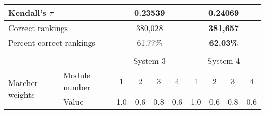 \documentclass[paper=a4, fontsize=11pt]{scrartcl}
\numberwithin{equation}{section}		%
\numberwithin{figure}{section}			%
\numberwithin{table}{section}				%
\begin{document}
\begin{table}[htbp]
{\begin{tabular}{llllllclll}
\multicolumn{2}{|l|}{Kendall's $\tau$}                                                           & \multicolumn{4}{c|}{0.23539}                                                                                      & \multicolumn{4}{c|}{{\bf 0.24069}}                                                                                \\ \hline
\multicolumn{2}{|l|}{Correct rankings}                                                           & \multicolumn{4}{c|}{380,028}                                                                                      & \multicolumn{4}{c|}{{\bf 381,657}}                                                                                \\ \hline
\multicolumn{2}{|l|}{Percent correct rankings}                                                   & \multicolumn{4}{c|}{61.77\%}                                                                                      & \multicolumn{4}{c|}{{\bf 62.03\%}}                                                                                \\ \hline
                                                            &                                    &                              &                           &                            &                           & \multicolumn{1}{l}{}         &                           &                            &                           \\ \cline{3-10} 
                                                            & \multicolumn{1}{l|}{}              & \multicolumn{4}{c|}{System 3}                                                                                     & \multicolumn{4}{c|}{System 4}                                                                                     \\ \hline
\multicolumn{1}{|l|}{\multirow{2}{*}{Matcher weights}}      & \multicolumn{1}{l|}{Module number} & \multicolumn{1}{c|}{1}       & \multicolumn{1}{c|}{2}    & \multicolumn{1}{c|}{3}     & \multicolumn{1}{c|}{4}    & \multicolumn{1}{c|}{1}       & \multicolumn{1}{c|}{2}    & \multicolumn{1}{c|}{3}     & \multicolumn{1}{c|}{4}    \\ \cline{2-10} 
\multicolumn{1}{|l|}{}                                      & \multicolumn{1}{l|}{Value}         & \multicolumn{1}{l|}{1.0}     & \multicolumn{1}{l|}{0.6}  & \multicolumn{1}{l|}{0.8}   & \multicolumn{1}{l|}{0.6}  & \multicolumn{1}{l|}{1.0}     & \multicolumn{1}{l|}{0.6}  & \multicolumn{1}{l|}{0.8}   & \multicolumn{1}{l|}{0.6}  \\ \hline

\end{tabular}}
\end{table}
\end{document}
